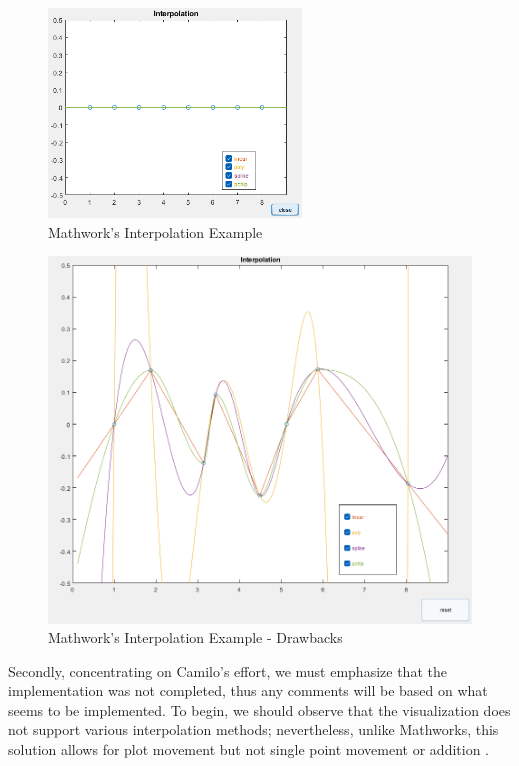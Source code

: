 \begin{figure}[H]
    \centering
    \includegraphics[width=0.6\textwidth]{Include/Images/Thesis/Development/Visualizers/INTERPOLATION VISUALIZER/Mathworks.Interpolation.Ex1.png}
    \caption{Mathwork's Interpolation Example}
    \label{fig:Mathworks Interpolation Example}
\end{figure}
\begin{figure}[H]
    \centering
    \includegraphics[width=\textwidth]{Include/Images/Thesis/Development/Visualizers/INTERPOLATION VISUALIZER/Mathworks.Interpolation.Ex1.1.png}
    \caption{Mathwork's Interpolation Example - Drawbacks}
    \label{fig:Mathwork's Interpolation Example - Drawbacks}
\end{figure}


Secondly, concentrating on Camilo's effort, we must emphasize that the implementation was not completed, thus any comments will be based on what seems to be implemented. To begin, we should observe that the visualization does not support various interpolation methods; nevertheless, unlike Mathworks, this solution allows for plot movement but not single point movement or addition .

